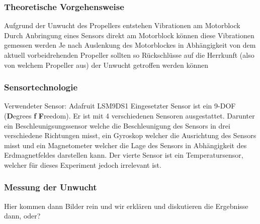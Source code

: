 \subsubsection*{Theoretische Vorgehensweise}
Aufgrund der Unwucht des Propellers entstehen Vibrationen am Motorblock
Durch Anbringung eines Sensors direkt am Motorblock können diese Vibrationen gemessen werden
Je nach Auslenkung des Motorblockes in Abhängigkeit von dem aktuell vorbeidrehenden Propeller sollten so Rückschlüsse auf die Herrkunft (also von welchem Propeller aus) der Unwucht getroffen werden können

\subsubsection*{Sensortechnologie}
Verwendeter Sensor: Adafruit LSM9DS1
Eingesetzter Sensor ist ein 9-DOF (\textbf{D}egrees \textbf{f} \textbf{F}reedom). Er ist mit 4 verschiedenen Sensoren ausgestattet. Darunter ein Beschleunigsungssensor welche die Beschleunigung des Sensors in drei verschiedene Richtungen misst, ein Gyroskop welcher die Ausrichtung des Sensors misst und ein Magnetometer welcher die Lage des Sensors in Abhängigkeit des Erdmagnetfeldes darstellen kann. Der vierte Sensor ist ein Temperatursensor, welcher für dieses Experiment jedoch irrelevant ist.

\subsubsection*{Messung der Unwucht}
Hier kommen dann Bilder rein und wir erklären und diskutieren die Ergebnisse dann, oder?

